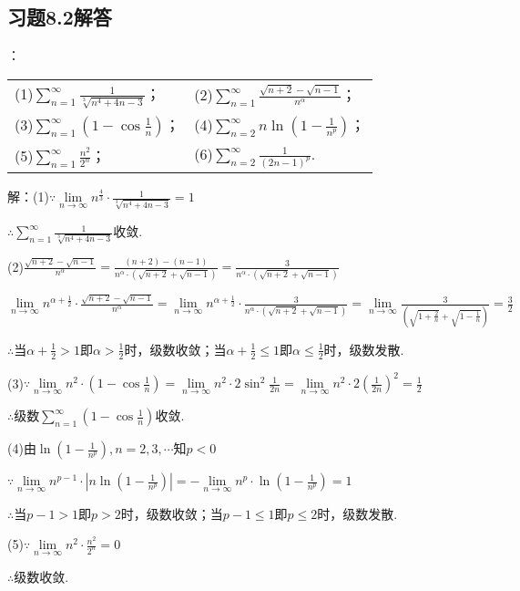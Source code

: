 \documentclass[12pt,UTF8]{ctexart}
\begin{document}
\subsection{习题8.2解答}
\begin{enumerate}
：
\newline
\begin{tabular}{ll}
(1)$\sum_{n=1}^\infty\frac1{\sqrt[3]{n^4+4n-3}}$；&(2)$\sum_{n=1}^\infty\frac{\sqrt{n+2}-\sqrt{n-1}}{n^\alpha}$；\\
(3)$\sum_{n=1}^\infty(1-\cos\frac1n)$；&(4)$\sum_{n=2}^\infty n\ln(1-\frac1{n^p})$；\\
(5)$\sum_{n=1}^\infty\frac{n^2}{2^n}$；&(6)$\sum_{n=2}^\infty\frac1{(2n-1)^p}$.
\end{tabular}

解：(1)$\because\lim\limits_{n\rightarrow\infty}n^{\frac43}\cdot\frac1{\sqrt[3]{n^4+4n-3}}=1$

$\therefore\sum_{n=1}^\infty\frac1{\sqrt[3]{n^4+4n-3}}$收敛.

(2)$\frac{\sqrt{n+2}-\sqrt{n-1}}{n^\alpha}=\frac{(n+2)-(n-1)}{n^\alpha\cdot(\sqrt{n+2}+\sqrt{n-1})}=\frac3{n^\alpha\cdot(\sqrt{n+2}+\sqrt{n-1})}$

$\lim\limits_{n\rightarrow\infty}n^{\alpha+\frac12}\cdot\frac{\sqrt{n+2}-\sqrt{n-1}}{n^\alpha}=\lim\limits_{n\rightarrow\infty}n^{\alpha+\frac12}\cdot\frac3{n^\alpha\cdot(\sqrt{n+2}+\sqrt{n-1})}=\lim\limits_{n\rightarrow\infty}\frac3{(\sqrt{1+\frac2n}+\sqrt{1-\frac1n})}=\frac32$

$\therefore$当$\alpha+\frac12>1$即$\alpha>\frac12$时，级数收敛；当$\alpha+\frac12\leq1$即$\alpha\leq\frac12$时，级数发散.

(3)$\because\lim\limits_{n\rightarrow\infty}n^2\cdot(1-\cos\frac1n)=\lim\limits_{n\rightarrow\infty}n^2\cdot2\sin^2\frac1{2n}=\lim\limits_{n\rightarrow\infty}n^2\cdot2(\frac1{2n})^2=\frac12$

$\therefore$级数$\sum_{n=1}^\infty(1-\cos\frac1n)$收敛.

(4)由$\ln(1-\frac1{n^p}),n=2,3,\cdots$知$p<0$

$\because\lim\limits_{n\rightarrow\infty}n^{p-1}\cdot|n\ln(1-\frac1{n^p})|=-\lim\limits_{n\rightarrow\infty}n^p\cdot\ln(1-\frac1{n^p})=1$

$\therefore$当$p-1>1$即$p>2$时，级数收敛；当$p-1\leq1$即$p\leq2$时，级数发散.

(5)$\because\lim\limits_{n\rightarrow\infty}n^2\cdot\frac{n^2}{2^n}=0$

$\therefore$级数收敛.


\end{enumerate}
\end{document}
